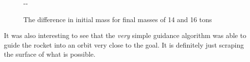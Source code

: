 \documentclass[11pt]{article}
\newlength{\offsetpage}
\newenvironment{widepage}{\begin{adjustwidth}{-\offsetpage}{-\offsetpage}%
    \addtolength{\textwidth}{2\offsetpage}}%
{\end{adjustwidth}}
\begin{document}
\begin{figure}[H]
\begin{widepage}
\begin{minipage}{0.45\textwidth}
      \caption{The difference in initial mass for final masses of 14 and 16 tons}
    \end{minipage}
  \end{widepage}
\end{figure}

It was also interesting to see that the \textit{very} simple guidance algorithm was able to guide the rocket into an orbit very close to the goal.
It is definitely just scraping the surface of what is possible.
\begingroup
\raggedright
{}
\endgroup
\end{document}
